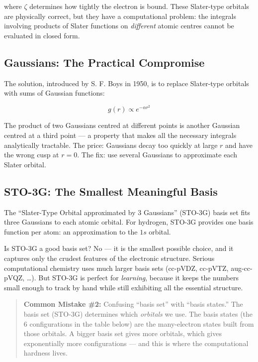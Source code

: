 \documentclass[
  11pt,
  oneside]{book}
\begin{document}
where \(\zeta\) determines how tightly the electron is bound. These
Slater-type orbitals are physically correct, but they have a
computational problem: the integrals involving products of Slater
functions on \emph{different} atomic centres cannot be evaluated in
closed form.

\subsection{Gaussians: The Practical
Compromise}\label{gaussians-the-practical-compromise}

The solution, introduced by S. F. Boys in 1950, is to replace
Slater-type orbitals with sums of Gaussian functions:

\[g(r) \propto e^{-\alpha r^2}\]

The product of two Gaussians centred at different points is another
Gaussian centred at a third point --- a property that makes all the
necessary integrals analytically tractable. The price: Gaussians decay
too quickly at large \(r\) and have the wrong cusp at \(r = 0\). The
fix: use several Gaussians to approximate each Slater orbital.

\subsection{STO-3G: The Smallest Meaningful
Basis}\label{sto-3g-the-smallest-meaningful-basis}

The ``Slater-Type Orbital approximated by 3 Gaussians'' (STO-3G) basis
set fits three Gaussians to each atomic orbital. For hydrogen, STO-3G
provides one basis function per atom: an approximation to the \(1s\)
orbital.

Is STO-3G a good basis set? No --- it is the smallest possible choice,
and it captures only the crudest features of the electronic structure.
Serious computational chemistry uses much larger basis sets (cc-pVDZ,
cc-pVTZ, aug-cc-pVQZ, \ldots). But STO-3G is perfect for
\emph{learning}, because it keeps the numbers small enough to track by
hand while still exhibiting all the essential structure.

\begin{quote}
\textbf{Common Mistake \#2:} Confusing ``basis set'' with ``basis
states.'' The basis set (STO-3G) determines which \emph{orbitals} we
use. The basis states (the 6 configurations in the table below) are the
many-electron states built from those orbitals. A bigger basis set gives
more orbitals, which gives exponentially more configurations --- and
this is where the computational hardness lives.
\end{quote}
\end{document}
